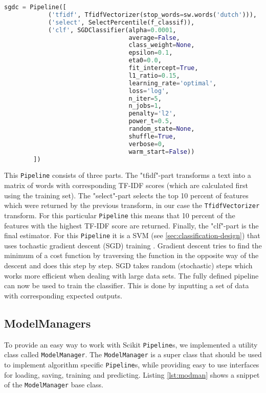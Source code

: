 \begin{lstlisting}[language=python, caption={SGDC Pipeline}, label={lst:sdgc}]
sgdc = Pipeline([
            ('tfidf', TfidfVectorizer(stop_words=sw.words('dutch'))),
            ('select', SelectPercentile(f_classif)),
            ('clf', SGDClassifier(alpha=0.0001,
                                  average=False,
                                  class_weight=None,
                                  epsilon=0.1,
                                  eta0=0.0,
                                  fit_intercept=True,
                                  l1_ratio=0.15,
                                  learning_rate='optimal',
                                  loss='log',
                                  n_iter=5,
                                  n_jobs=1,
                                  penalty='l2',
                                  power_t=0.5,
                                  random_state=None,
                                  shuffle=True,
                                  verbose=0,
                                  warm_start=False))
        ])
\end{lstlisting}
This \texttt{Pipeline} consists of three parts. The "tfidf"-part transforms a text into a matrix of words with corresponding TF-IDF scores (which are calculated first using the training set). The "select"-part selects the top 10 percent of features which were returned by the previous transform, in our case the \texttt{TfidfVectorizer} transform. For this particular \texttt{Pipeline} this means that 10 percent of the features with the highest TF-IDF score are returned. Finally, the "clf"-part is the final estimator. For this \texttt{Pipeline} it is a SVM (see \ref{sec:classification-design}) that uses tochastic gradient descent (SGD) training \cite{bottou2010large}. Gradient descent tries to find the minimum of a cost function by traversing the function in the opposite way of the descent and does this step by step. SGD takes random (stochastic) steps which works more efficient when dealing with large data sets.
The fully defined pipeline can now be used to train the classifier. This is done by inputting a set of data with corresponding expected outputs.

\subsection{ModelManagers}
To provide an easy way to work with Scikit \texttt{Pipeline}s, we implemented a utility class called \texttt{ModelManager}. The \texttt{ModelManager} is a super class that should be used to implement algorithm specific \texttt{Pipeline}s, while providing easy to use interfaces for loading, saving, training and predicting. Listing \ref{lst:modman} shows a snippet of the \texttt{ModelManager} base class.

